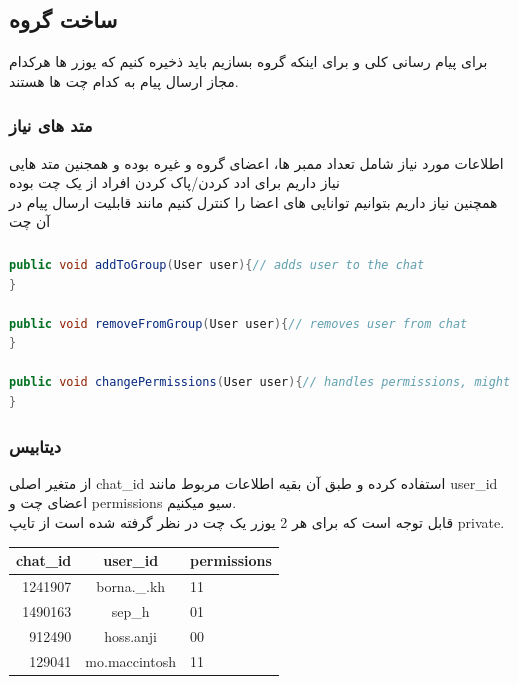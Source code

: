 \documentclass[12pt]{article}
\begin{document}
\subsection{ساخت گروه}
برای پیام رسانی کلی و برای اینکه گروه بسازیم باید ذخیره کنیم که یوزر ها
هرکدام مجاز ارسال پیام به کدام چت ها هستند.\\
\subsubsection{متد های نیاز}
اطلاعات مورد نیاز شامل تعداد ممبر ها، اعضای گروه و غیره بوده و
همجنین متد هایی نیاز داریم برای ادد کردن/پاک کردن افراد از یک چت بوده\\
همچنین نیاز داریم بتوانیم توانایی های اعضا را کنترل کنیم مانند قابلیت
ارسال پیام در آن چت
\begin{latin}
    \subsubsection*{}
    \begin{lstlisting}[language=Java,label={lst:code}, mathescape=true, breaklines=true]
public void addToGroup(User user){// adds user to the chat
}

public void removeFromGroup(User user){// removes user from chat
}

public void changePermissions(User user){// handles permissions, might take extra input
}
    \end{lstlisting}
\end{latin}
\subsubsection{دیتابیس}
از متغیر اصلی chat\_id استفاده کرده و طبق آن بقیه اطلاعات مربوط
مانند user\_id اعضای چت و permissions سیو میکنیم.\\
قابل توجه است که برای هر 2 یوزر یک چت در نظر گرفته شده است
از تایپ private.\\
\begin{latin}
    \begin{table}[b]
        \centering
        \begin{tabular}{|r|c|l|}
            \hline
            chat\_id & user\_id      & permissions \\
            \hline
            1241907  & borna.\_.kh   & 11          \\
            1490163  & sep\_h        & 01          \\
            912490   & hoss.anji     & 00          \\
            129041   & mo.maccintosh & 11          \\
            \hline
        \end{tabular}
    \end{table}
\end{latin}
\pagebreak
\end{document}
